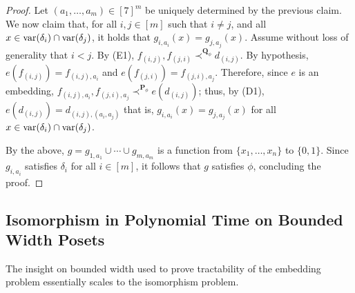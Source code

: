 \documentclass[usletter]{article}
\newcommand{\longversion}[1]{#1}
\newcommand{\shortversion}[1]{}
\newcommand{\longshort}[2]{\longversion{#1}\shortversion{#2}}
\newcommand{\pp}{\mathbf{P}}
\newcommand{\qq}{\mathbf{Q}}
\begin{document}
{\begin{proof}
Let $(a_1,\ldots,a_m) \in [7]^m$ be uniquely determined by the previous 
claim.  We now claim that, for all $i,j \in [m]$ such that $i \neq j$, 
and all $x \in \textup{var}(\delta_i) \cap \textup{var}(\delta_{j})$, 
it holds that $g_{i,a_i}(x)=g_{j,a_j}(x)$.  Assume without loss of generality that $i<j$.  
By (E1), $f_{(i,j)},f_{(j,i)} \prec^{\qq_\phi} d_{(i,j)}$.  
By hypothesis, $e(f_{(i,j)})=f_{(i,j),a_i}$ and $e(f_{(j,i)})=f_{(j,i),a_j}$.  
Therefore, since $e$ is an embedding, $f_{(i,j),a_i},f_{(j,i),a_j} \prec^{\pp_\phi} e(d_{(i,j)})$; 
thus, by (D1), $e(d_{(i,j)})=d_{(i,j),(a_i,a_j)}$ that is, 
$g_{i,a_i}(x)=g_{j,a_j}(x)$ for all $x \in \textup{var}(\delta_i) \cap \textup{var}(\delta_{j})$.  

By the above, $g=g_{1,a_1} \cup \cdots \cup g_{m,a_m}$ is a 
function from $\{x_1,\ldots,x_n\}$ to $\{0,1\}$.  Since $g_{i,a_i}$ 
satisfies $\delta_i$ for all $i\in [m]$, it follows that $g$ satisfies $\phi$, concluding the proof.
\end{proof}}


\longversion{\pfdegreenphard}

\longshort{\subsection{Isomorphism in Polynomial Time on Bounded Width Posets}\label{sect:wdtract}}{\subsection{Isomorphism in Polytime on Bounded Width Posets}\label{sect:wdtract}}

The insight on bounded width used to prove tractability of the embedding problem 
essentially scales to the isomorphism problem.
\end{document}
